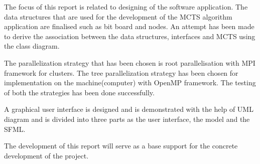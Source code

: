 The focus of this report is related to designing of the software application.
The data structures that are used for the development of the MCTS algorithm application are finalised such as bit board and nodes. An attempt has been made to derive the association between the data structures, interfaces  and MCTS using the class diagram. 

The parallelization strategy that has been chosen is root parallelisation with MPI framework for clusters. The tree parallelization strategy has been chosen for implementation on the machine(computer) with  OpenMP framework. The testing of both the strategies has been done successfully.

A graphical user interface is designed and is demonstrated with the help of UML diagram and is divided into three parts as the user interface, the model and the SFML.

The development of this report will serve as a base support for the concrete development of the project.
